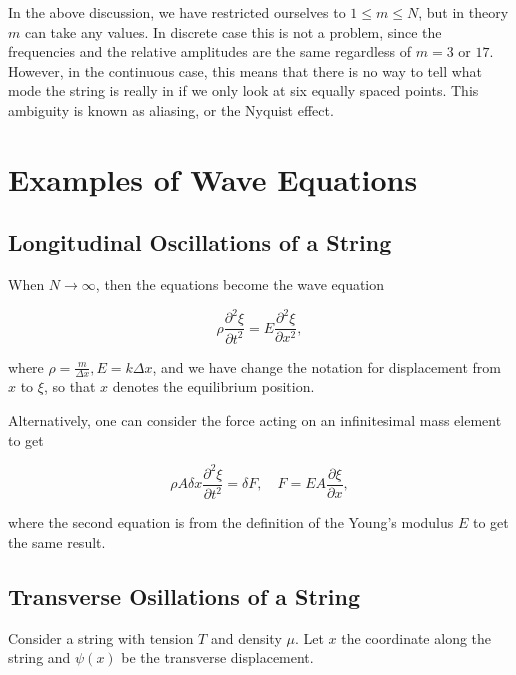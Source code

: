 \documentclass[a4paper,12pt]{report}
\begin{document}

In the above discussion, we have restricted ourselves to \(1 \le m \le N\), but in theory \(m\) can take any values. In discrete case this is not a problem, since the frequencies and the relative amplitudes are the same regardless of \(m = 3 \text { or } 17\). However, in the continuous case, this means that there is no way to tell what mode the string is really in if we only look at six equally spaced points. This ambiguity is known as aliasing, or the Nyquist effect.


\section{Examples of Wave Equations}

\subsection{Longitudinal Oscillations of a String}

When \(N \to \infty\), then the equations become the wave equation 

\begin{equation}
	\rho \frac{\partial^2 \xi }{\partial t^2} = E \frac{\partial^2 \xi }{\partial x^2},   
\end{equation}

where \(\displaystyle \rho = \frac{m}{\Delta x}, E = k \Delta x \), and we have change the notation for displacement from \(x\) to \(\xi \), so that \(x\) denotes the equilibrium position.   

Alternatively, one can consider the force acting on an infinitesimal mass element to get 

\begin{equation}
	\rho A \delta x \frac{\partial^2 \xi }{\partial t^2} = \delta F , \quad F = EA \frac{\partial \xi }{\partial x}, 
\end{equation}

where the second equation is from the definition of the Young's modulus \(E\) to get the same result.


\subsection{Transverse Osillations of a String}

Consider a string with tension \(T\) and density \(\mu \). Let \(x\) the coordinate along the string and \(\psi (x)\) be the transverse displacement.
\end{document}
